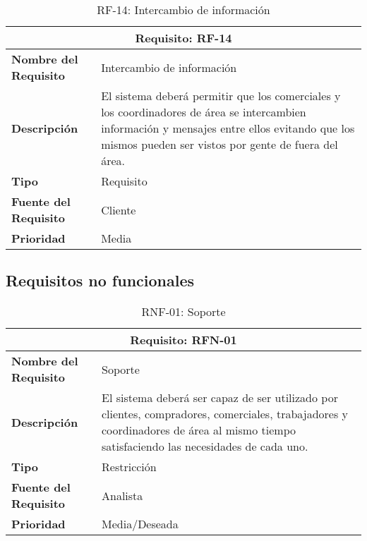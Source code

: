 \begin{table}[H]
\begin{center}
\begin{tabular}{p{} p{7cm}}
\multicolumn{2}{c}{\textbf{Requisito: RF-14} } \\
\hline \hline
\textbf{Nombre del Requisito} & Intercambio de información  \\
\hline
\textbf{Descripción} & El sistema deberá permitir que los comerciales y los coordinadores de área se intercambien información y mensajes entre ellos evitando que los mismos pueden ser vistos por gente de fuera del área. \\
\hline
\textbf{Tipo} & Requisito  \\
\hline
\textbf{Fuente del Requisito} & Cliente  \\
\hline
\textbf{Prioridad} & Media  \\ \hline
\end{tabular}
\caption{RF-14: Intercambio de información}
\label{tab:RF-14}
\end{center}
\end{table}




\subsection{Requisitos no funcionales}

\begin{table}[H]
\begin{center}
\begin{tabular}{p{} p{7cm}}
\multicolumn{2}{c}{\textbf{Requisito: RFN-01} } \\
\hline \hline
\textbf{Nombre del Requisito} & Soporte  \\
\hline
\textbf{Descripción} & El sistema deberá ser capaz de ser utilizado por clientes, compradores, comerciales, trabajadores y coordinadores de área al mismo tiempo satisfaciendo las necesidades de cada uno. \\
\hline
\textbf{Tipo} & Restricción \\
\hline
\textbf{Fuente del Requisito} &  Analista \\
\hline
\textbf{Prioridad} &  Media/Deseada \\ \hline
\end{tabular}
\caption{RNF-01: Soporte}
\label{tab:RFN-01}
\end{center}
\end{table}

